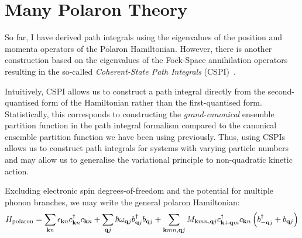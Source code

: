 \section{Many Polaron Theory}

So far, I have derived path integrals using the eigenvalues of the position and momenta operators of the Polaron Hamiltonian. However, there is another construction based on the eigenvalues of the Fock-Space annihilation operators resulting in the so-called \emph{Coherent-State Path Integrals} (CSPI)~\cite{altland_condensed_2010}.

Intuitively, CSPI allows us to construct a path integral directly from the second-quantised form of the Hamiltonian rather than the first-quantised form. Statistically, this corresponds to constructing the \emph{grand-canonical} ensemble partition function in the path integral formalism compared to the canonical ensemble partition function we have been using previously. Thus, using CSPIs allows us to construct path integrals for systems with varying particle numbers and may allow us to generalise the variational principle to non-quadratic kinetic action.

Excluding electronic spin degrees-of-freedom and the potential for multiple phonon branches, we may write the general polaron Hamiltonian:
\begin{equation}
    H_{\text{polaron}} = \sum_{\vb{k}n} \epsilon_{\vb{k}n} c^\dagger_{\vb{k}n} c_{\vb{k}n} + \sum_{\vb{q}j} \hbar \omega_{\vb{q}j} b^\dagger_{\vb{q}j} b_{\vb{q}j} + \sum_{\vb{k}mn, \vb{q}j} M_{\vb{k}mn,\vb{q}j} c^\dagger_{\vb{k}+\vb{q}m}c_{\vb{k}n} \left( b^\dagger_{-\vb{q}j} + b_{\vb{q}j} \right)
\end{equation}



